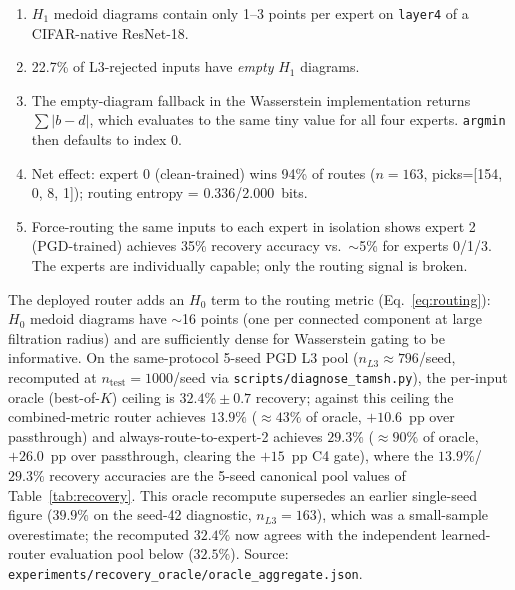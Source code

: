 \begin{enumerate}[leftmargin=*,noitemsep]
  \item $H_1$ medoid diagrams contain only 1--3 points per expert on
        \texttt{layer4} of a CIFAR-native ResNet-18.
  \item 22.7\% of L3-rejected inputs have \emph{empty} $H_1$ diagrams.
  \item The empty-diagram fallback in the Wasserstein implementation
        returns $\sum |b-d|$, which evaluates to the same tiny value for
        all four experts. \texttt{argmin} then defaults to index 0.
  \item Net effect: expert 0 (clean-trained) wins 94\% of routes ($n=163$,
        picks=[154, 0, 8, 1]); routing entropy = 0.336/2.000~bits.
  \item Force-routing the same inputs to each expert in isolation shows
        expert 2 (PGD-trained) achieves 35\% recovery accuracy vs.\
        $\sim$5\% for experts 0/1/3. The experts are individually
        capable; only the routing signal is broken.
\end{enumerate}

\noindent
The deployed router adds an $H_0$ term to the routing metric (Eq.~\ref{eq:routing}):
$H_0$ medoid diagrams have $\sim$16 points (one per connected component
at large filtration radius) and are sufficiently dense for Wasserstein
gating to be informative. On the same-protocol 5-seed PGD L3 pool
($n_{L3}{\approx}796$/seed, recomputed at $n_\text{test}{=}1000$/seed via
\texttt{scripts/diagnose\_tamsh.py}), the per-input oracle (best-of-$K$)
ceiling is $\mathbf{32.4\% \pm 0.7}$ recovery; against this ceiling the
combined-metric router achieves $13.9\%$ ($\approx 43\%$ of oracle,
$+10.6$~pp over passthrough) and always-route-to-expert-2 achieves
$29.3\%$ ($\approx 90\%$ of oracle, $+26.0$~pp over passthrough, clearing
the $+15$~pp C4 gate), where the $13.9\%$/$29.3\%$ recovery accuracies are
the 5-seed canonical pool values of Table~\ref{tab:recovery}. This oracle
recompute supersedes an earlier single-seed figure ($39.9\%$ on the
seed-42 diagnostic, $n_{L3}{=}163$), which was a small-sample overestimate;
the recomputed $32.4\%$ now agrees with the independent learned-router
evaluation pool below ($32.5\%$). Source:
\texttt{experiments/recovery\_oracle/oracle\_aggregate.json}.

